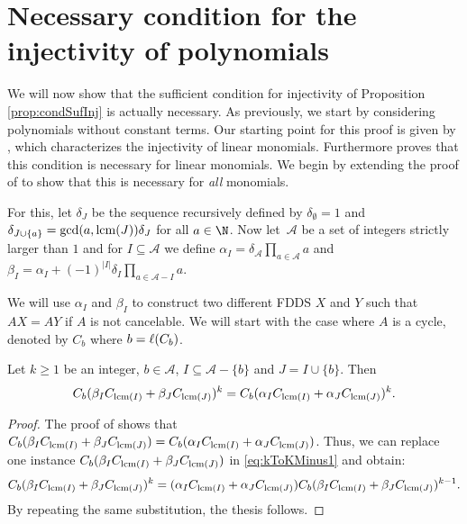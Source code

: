 \section{Necessary condition for the injectivity of polynomials}\label{section:cond_nec_poly_FDDS_inj}
	
	We will now show that the sufficient condition for injectivity of Proposition \ref{prop:condSufInj} is actually necessary.
	As previously, we start by considering polynomials without constant terms.
	Our starting point for this proof is given by  \cite[Theorem 34]{article_arbre}, which characterizes the injectivity of linear monomials.
	Furthermore \cite[Lemma 33]{article_arbre} proves that this condition is necessary for linear monomials.
	We begin by extending the proof of \cite[Lemma 33]{article_arbre} to show that this is necessary for \emph{all} monomials. 
	
	For this, let $\delta_J$ be the sequence recursively defined by $\delta_\emptyset = 1$ and $\delta_{J \cup \{a\}} = \gcd(a, \operatorname{lcm}(J)) \delta_J$ for all $a \in \N$. 
	Now let~$\mathcal{A}$ be a set of integers strictly larger than $1$ and for $I \subseteq \mathcal{A}$ we define $\alpha_I = \delta_\mathcal{A}\prod_{a \in \mathcal{A}} a$ and $\beta_I = \alpha_I + (-1)^{|I|}\delta_I \prod_{a \in \mathcal{A} - I} a$.
	
	We will use $\alpha_I$ and $\beta_I$ to construct two different FDDS $X$ and $Y$ such that $AX = AY$ if $A$ is not cancelable.
	We will start with the case where $A$ is a cycle, denoted by $C_b$ where $b = \ell(C_b)$.
	
	\begin{lemma}\label{lemme:cycleNonInjTech}
                Let $k \ge 1$ be an integer, $b \in \mathcal{A}$, $I \subseteq \mathcal{A} - \{b\}$ and $J = I \cup \{b\}$. Then
                \begin{equation}
                \label{eq:kToKMinus1}
                C_b (\beta_I C_{\operatorname{lcm}(I)} + \beta_J C_{\operatorname{lcm}(J)})^k = C_b (\alpha_I C_{\operatorname{lcm}(I)} + \alpha_J C_{\operatorname{lcm}(J)})^k.
                \end{equation}
	\end{lemma}
	
	\begin{proof}
		The proof of \cite[Lemma 33]{article_arbre} shows that $C_b (\beta_I C_{\operatorname{lcm}(I)} + \beta_J C_{\operatorname{lcm}(J)}) = C_b (\alpha_I C_{\operatorname{lcm}(I)} + \alpha_J C_{\operatorname{lcm}(J)})$.
		Thus, we can replace one instance $C_b (\beta_I C_{\operatorname{lcm}(I)} + \beta_J C_{\operatorname{lcm}(J)})$ in \eqref{eq:kToKMinus1} %
                and obtain:
		\[C_b (\beta_I C_{\operatorname{lcm}(I)} + \beta_J C_{\operatorname{lcm}(J)})^k =(\alpha_I C_{\operatorname{lcm}(I)} + \alpha_J C_{\operatorname{lcm}(J)}) C_b (\beta_I C_{\operatorname{lcm}(I)} + \beta_J C_{\operatorname{lcm}(J)})^{k-1}.\]
		By repeating the same substitution, the thesis follows.
	\end{proof}
	
